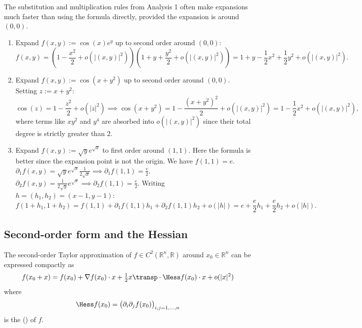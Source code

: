 \begin{example}
\label{ex:more_taylor_via_analysis1}
The substitution and multiplication rules from Analysis 1 often make expansions much faster than using the formula directly, provided the expansion is around $(0,0)$.
\begin{enumerate}[label=\textbf{(\alph*)}]
  \item Expand $f(x,y) := \cos(x)e^y$ up to second order around $(0,0)$:
  \[f(x,y) = \left(1 - \frac{x^2}{2} + o(|(x,y)|^2)\right)\left(1 + y + \frac{y^2}{2} + o(|(x,y)|^2)\right) = 1 + y - \frac{1}{2}x^2 + \frac{1}{2}y^2 + o(|(x,y)|^2).\]
  \item Expand $f(x,y) := \cos(x+y^2)$ up to second order around $(0,0)$. Setting $z := x+y^2$:
  \[\cos(z) = 1 - \frac{z^2}{2} + o(|z|^2) \implies \cos(x+y^2) = 1 - \frac{(x+y^2)^2}{2} + o(|(x,y)|^2) = 1 - \frac{1}{2}x^2 + o(|(x,y)|^2),\]
  where terms like $xy^2$ and $y^4$ are absorbed into $o(|(x,y)|^2)$ since their total degree is strictly greater than $2$.
  \item Expand $f(x,y) := \sqrt{y} e^{\sqrt{x}}$ to first order around $(1,1)$. Here the formula is better since the expansion point is not the origin.
  We have $f(1,1) = e$.
  $\partial_1 f(x,y) = \sqrt{y} e^{\sqrt{x}} \frac{1}{2\sqrt{x}} \implies \partial_1 f(1,1) = \frac{e}{2}$.
  $\partial_2 f(x,y) = \frac{1}{2\sqrt{y}} e^{\sqrt{x}} \implies \partial_2 f(1,1) = \frac{e}{2}$.
  Writing $h = (h_1,h_2) = (x-1, y-1)$:
  \[f(1+h_1, 1+h_2) = f(1,1) + \partial_1 f(1,1)h_1 + \partial_2 f(1,1)h_2 + o(|h|) = e + \frac{e}{2}h_1 + \frac{e}{2}h_2 + o(|h|).\]
\end{enumerate}
\end{example}

\subsection{Second-order form and the Hessian}

\begin{remark}
\label{rem:second_order_taylor_hessian}
The second-order Taylor approximation of $f \in C^2(\mathbb{R}^n,\mathbb{R})$ around
$x_0 \in \mathbb{R}^n$ can be expressed compactly as
\[f(x_0+x) = f(x_0) + \nabla f(x_0)\cdot x + \tfrac{1}{2}x\transp \cdot \Hess f(x_0)\cdot x + o(|x|^2)\]
where
\[\Hess f(x_0) = \big(\partial_i\partial_j f(x_0)\big)_{i,j=1,\dots,n}\]
is the  () of $f$.
\end{remark}

